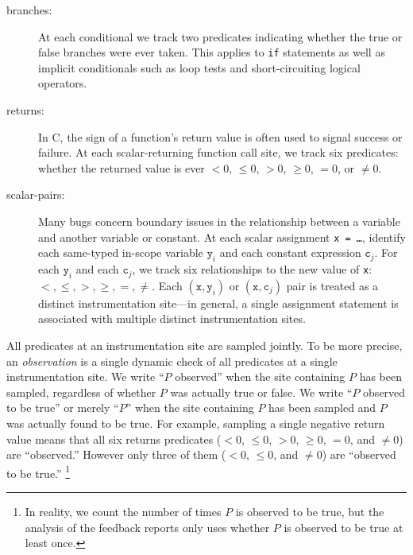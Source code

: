 \documentclass[final]{sigplanconf}
\newcommand{\termdef}[1]{\emph{#1}}
\begin{document}
\begin{description}

\item[branches:] At each conditional we track two predicates
  indicating whether the true or false branches were ever taken.  This
  applies to \texttt{if} statements as well as implicit conditionals
  such as loop tests and short-circuiting logical operators.

\item[returns:] In C, the
  sign of a function's return value is often used to signal success or failure.
  At each scalar-returning function call site, we track six predicates:
  whether the returned value is ever $< 0$, $\leq 0$, $> 0$, $\geq 0$,
  $= 0$, or $\neq 0$.

\item[scalar-pairs:] Many bugs
  concern boundary issues in the relationship between a
  variable and another variable or constant.  At
  each scalar assignment \texttt{x = \dots}, identify each
  same-typed in-scope variable $\mathtt{y}_i$ and each
  constant expression $\mathtt{c}_j$.  For each   $\mathtt{y}_i$ and each $\mathtt{c}_j$,
  we track six relationships to the new value of \texttt{x}: $<, \leq, >, \geq, =, \neq$.
  Each $(\mathtt{x}, \mathtt{y}_i)$ or $(\mathtt{x}, \mathtt{c}_j)$ pair
  is treated as a distinct instrumentation site---in general, a single assignment statement is associated with multiple distinct instrumentation sites.
\end{description}

All predicates at an instrumentation site are sampled jointly.  To be
more precise, an \termdef{observation} is a single dynamic check of
all predicates at a single instrumentation site.  We write ``$P$
observed'' when the site containing $P$ has been sampled, regardless
of whether $P$ was actually true or false.  We write ``$P$ observed to
be true'' or merely ``$P$'' when the site containing $P$ has been
sampled and $P$ was actually found to be true.  For example, sampling
a single negative return value means that all six returns predicates
($< 0$, $\leq 0$, $> 0$, $\geq 0$, $= 0$, and $\neq 0$) are
``observed.''  However only three of them ($< 0$, $\leq 0$, and $\neq
0$) are ``observed to be true.''  \footnote{In reality, we count the
number of times $P$ is observed to be true, but the analysis of the
feedback reports only uses whether $P$ is observed to be true at least
once.}
\end{document}
